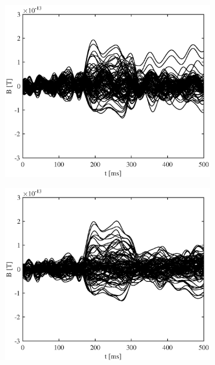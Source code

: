 \documentclass[doc,a4paper,12pt]{apa6}
\begin{document}
\begin{figure}
\begin{subfigure}[c]{0.36\textwidth}
    \label{img:butterfly:mag:sss:pa07}
  \end{subfigure}\vspace*{0.02\textwidth}
  \begin{subfigure}[c]{0.36\textwidth}
    \includegraphics[width=\textwidth]{ergebnisse/butterfly/pa10a1_eve2_raw_mag_butterfly.eps}
    \label{img:butterfly:mag:raw:pa10}
  \end{subfigure}\hspace*{0.08\textwidth}
  \begin{subfigure}[c]{0.36\textwidth}
    \includegraphics[width=\textwidth]{ergebnisse/butterfly/pa10a1_eve2_sss_mag_butterfly.eps}

\end{subfigure}
\end{figure}
\end{document}
